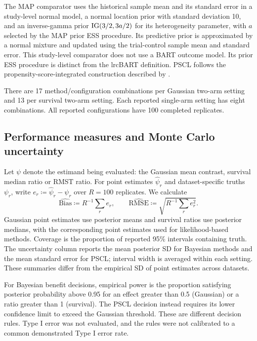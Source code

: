 The MAP comparator uses the historical sample mean and its standard error in a study-level normal model, a normal location prior with standard deviation 10, and an inverse-gamma prior $\operatorname{IG}(3/2,3a/2)$ for its heterogeneity parameter, with $a$ selected by the MAP prior ESS procedure. Its predictive prior is approximated by a normal mixture and updated using the trial-control sample mean and standard error. This study-level comparator does not use a BART outcome model. Its prior ESS procedure is distinct from the lrcBART definition. PSCL follows the propensity-score-integrated construction described by \citet{Chen2020PSCL}.

There are 17 method/configuration combinations per Gaussian two-arm setting and 13 per survival two-arm setting. Each reported single-arm setting has eight combinations. All reported configurations have 100 completed replicates.

\subsection{Performance measures and Monte Carlo uncertainty}\label{sec:E.5}
Let $\psi$ denote the estimand being evaluated: the Gaussian mean contrast, survival median ratio or RMST ratio. For point estimates $\widehat\psi_r$ and dataset-specific truths $\psi_r$, write $e_r\coloneqq \widehat\psi_r-\psi_r$ over $R=100$ replicates. We calculate
\begin{equation}
\widehat{\mathrm{Bias}}\coloneqq R^{-1}\sum_r e_r,\qquad
\widehat{\mathrm{RMSE}}\coloneqq \sqrt{R^{-1}\sum_r e_r^2}.
\end{equation}
Gaussian point estimates use posterior means and survival ratios use posterior medians, with the corresponding point estimates used for likelihood-based methods. Coverage is the proportion of reported 95\% intervals containing truth. The uncertainty column reports the mean posterior SD for Bayesian methods and the mean standard error for PSCL; interval width is averaged within each setting. These summaries differ from the empirical SD of point estimates across datasets.

For Bayesian benefit decisions, empirical power is the proportion satisfying posterior probability above 0.95 for an effect greater than 0.5 (Gaussian) or a ratio greater than 1 (survival). The PSCL decision instead requires its lower confidence limit to exceed the Gaussian threshold. These are different decision rules. Type I error was not evaluated, and the rules were not calibrated to a common demonstrated Type I error rate.

